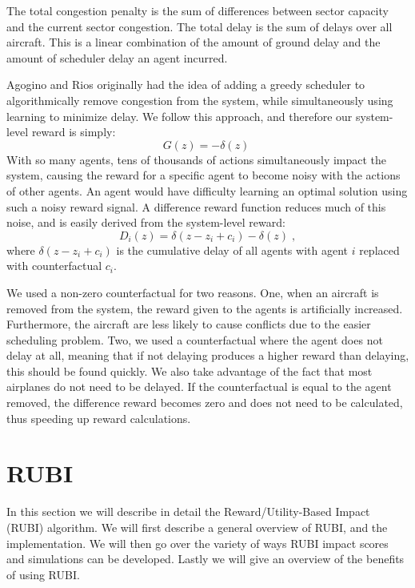 \documentclass{aamas2014}
\begin{document}
The total congestion penalty is the sum of differences between sector capacity and the current sector congestion. The total delay is the sum of delays over all aircraft. This is a linear combination of the amount of ground delay and the amount of scheduler delay an agent incurred.

Agogino and Rios originally had the idea of adding a greedy scheduler to algorithmically remove congestion from the system, while simultaneously using learning to minimize delay. We follow this approach, and therefore our system-level reward is simply:
%
\begin{equation} \label{eq:Global}
G(z) = -\delta(z)\;
\end{equation}
%
With so many agents, tens of thousands of actions simultaneously impact the system, causing the reward for a specific agent to become noisy with the actions of other agents. An agent would have difficulty learning an optimal solution using such a noisy reward signal. A difference reward function reduces much of this noise, and is easily derived from the system-level reward:
%
\begin{equation}
D_i(z) = \delta(z-z_i + c_i) - \delta(z)\;,
\end{equation}
%
where \textit{$\delta(z-z_i + c_i)$} is the cumulative delay of all agents with agent $i$ replaced with counterfactual \textit{$c_i$}.

We used a non-zero counterfactual for two reasons. One, when an aircraft is removed from the system, the reward given to the agents is artificially increased. Furthermore, the aircraft are less likely to cause conflicts due to the easier scheduling problem. Two, we used a counterfactual where the agent does not delay at all, meaning that if not delaying produces a higher reward than delaying, this should be found quickly. We also take advantage of the fact that most airplanes do not need to be delayed. If the counterfactual is equal to the agent removed, the difference reward becomes zero and does not need to be calculated, thus speeding up reward calculations.

\section{RUBI}
In this section we will describe in detail the Reward/Utility-Based Impact (RUBI) algorithm. We will first describe a general overview of RUBI, and the implementation. We will then go over the variety of ways RUBI impact scores and simulations can be developed. Lastly we will give an overview of the benefits of using RUBI.
\end{document}
